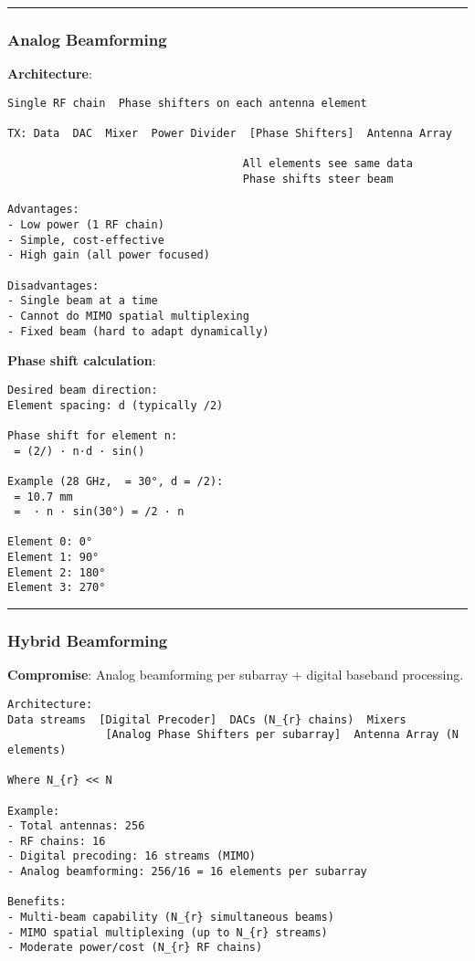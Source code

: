 \begin{center}\rule{0.5\linewidth}{0.5pt}\end{center}

\subsubsection{Analog Beamforming}\label{analog-beamforming}

\textbf{Architecture}:

\begin{verbatim}
Single RF chain  Phase shifters on each antenna element

TX: Data  DAC  Mixer  Power Divider  [Phase Shifters]  Antenna Array
                                           
                                    All elements see same data
                                    Phase shifts steer beam

Advantages:
- Low power (1 RF chain)
- Simple, cost-effective
- High gain (all power focused)

Disadvantages:
- Single beam at a time
- Cannot do MIMO spatial multiplexing
- Fixed beam (hard to adapt dynamically)
\end{verbatim}

\textbf{Phase shift calculation}:

\begin{verbatim}
Desired beam direction: 
Element spacing: d (typically /2)

Phase shift for element n:
 = (2/) · n·d · sin()

Example (28 GHz,  = 30°, d = /2):
 = 10.7 mm
 =  · n · sin(30°) = /2 · n

Element 0: 0°
Element 1: 90°
Element 2: 180°
Element 3: 270°
\end{verbatim}

\begin{center}\rule{0.5\linewidth}{0.5pt}\end{center}

\subsubsection{Hybrid Beamforming}\label{hybrid-beamforming}

\textbf{Compromise}: Analog beamforming per subarray + digital baseband
processing.

\begin{verbatim}
Architecture:
Data streams  [Digital Precoder]  DACs (N_{r} chains)  Mixers 
               [Analog Phase Shifters per subarray]  Antenna Array (N elements)

Where N_{r} << N

Example:
- Total antennas: 256
- RF chains: 16
- Digital precoding: 16 streams (MIMO)
- Analog beamforming: 256/16 = 16 elements per subarray

Benefits:
- Multi-beam capability (N_{r} simultaneous beams)
- MIMO spatial multiplexing (up to N_{r} streams)
- Moderate power/cost (N_{r} RF chains)
\end{verbatim}

